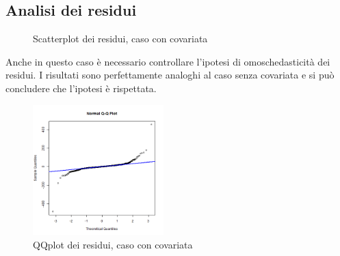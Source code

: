 \documentclass[a4paper,11pt,twoside,openright]{book}							%
\begin{document}
\subsection{Analisi dei residui}

\begin{figure}[t]
	\centering
	\caption{Scatterplot dei residui, caso con covariata}
	\label{fig:Vencovar_residui}
\end{figure}
Anche in questo caso è necessario controllare l'ipotesi di omoschedasticità dei residui. I risultati sono perfettamente analoghi al caso senza covariata e si può concludere che l'ipotesi è rispettata.
\newpage
\begin{figure}[h]
	\centering
	\includegraphics[width=0.45\textwidth]{Immagini/venezia_con_covariate/QQplot.png}   
   \caption{QQplot dei residui, caso con covariata}
	\label{fig:Ven_qqplot}
\end{figure}
\end{document}
